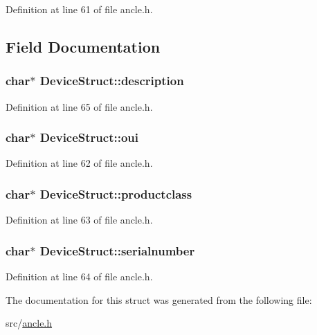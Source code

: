 Definition at line 61 of file ancle.\-h.



\subsection{Field Documentation}
\hypertarget{structDeviceStruct_a7c6bdc123c89125b52aa347b0ef0d436}{
\subsubsection[{description}]{\setlength{\rightskip}{0pt plus 5cm}char$\ast$ Device\-Struct\-::description}}\label{structDeviceStruct_a7c6bdc123c89125b52aa347b0ef0d436}


Definition at line 65 of file ancle.\-h.

\hypertarget{structDeviceStruct_ae8bec302b6b5c6d0a0fe1e64e4a45a37}{
\subsubsection[{oui}]{\setlength{\rightskip}{0pt plus 5cm}char$\ast$ Device\-Struct\-::oui}}\label{structDeviceStruct_ae8bec302b6b5c6d0a0fe1e64e4a45a37}


Definition at line 62 of file ancle.\-h.

\hypertarget{structDeviceStruct_a8411736ff451abaad5414e3dca6e671b}{
\subsubsection[{productclass}]{\setlength{\rightskip}{0pt plus 5cm}char$\ast$ Device\-Struct\-::productclass}}\label{structDeviceStruct_a8411736ff451abaad5414e3dca6e671b}


Definition at line 63 of file ancle.\-h.

\hypertarget{structDeviceStruct_a3d613c2cae19aac655b22ca3958ba601}{
\subsubsection[{serialnumber}]{\setlength{\rightskip}{0pt plus 5cm}char$\ast$ Device\-Struct\-::serialnumber}}\label{structDeviceStruct_a3d613c2cae19aac655b22ca3958ba601}


Definition at line 64 of file ancle.\-h.



The documentation for this struct was generated from the following file\-:\begin{DoxyCompactItemize}
\item 
src/\hyperlink{ancle_8h}{ancle.\-h}\end{DoxyCompactItemize}
